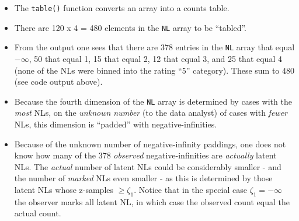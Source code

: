 \documentclass[
]{book}
\newenvironment{Shaded}{\begin{snugshade}}{\end{snugshade}}
\newcommand{\CommentTok}[1]{\textcolor[rgb]{0.56,0.35,0.01}{\textit{#1}}}
\newcommand{\DecValTok}[1]{\textcolor[rgb]{0.00,0.00,0.81}{#1}}
\newcommand{\FunctionTok}[1]{\textcolor[rgb]{0.00,0.00,0.00}{#1}}
\newcommand{\NormalTok}[1]{#1}
\newcommand{\SpecialCharTok}[1]{\textcolor[rgb]{0.00,0.00,0.00}{#1}}
\providecommand{\tightlist}{%
  \setlength{\itemsep}{0pt}\setlength{\parskip}{0pt}}
\begin{document}
\begin{itemize}
\tightlist
\item
  The \texttt{table()} function converts an array into a counts table.
\item
  There are 120 x 4 = 480 elements in the \texttt{NL} array to be ``tabled''.
\item
  From the output one sees that there are 378 entries in the \texttt{NL} array that equal \(-\infty\), 50 that equal 1, 15 that equal 2, 12 that equal 3, and 25 that equal 4 (none of the NLs were binned into the rating ``5'' category). These sum to 480 (see code output above).
\item
  Because the fourth dimension of the \texttt{NL} array is determined by cases with the \emph{most} NLs, on the \emph{unknown number} (to the data analyst) of cases with \emph{fewer} NLs, this dimension is ``padded'' with negative-infinities.\\
\item
  Because of the unknown number of negative-infinity paddings, one does not know how many of the 378 \emph{observed} negative-infinities are \emph{actually} latent NLs. The \emph{actual} number of latent NLs could be considerably smaller - and the number of \emph{marked} NLs even smaller - as this is determined by those latent NLs whose z-samples \(\geq \zeta_1\). Notice that in the special case \(\zeta_1 = -\infty\) the observer marks all latent NL, in which case the observed count equal the actual count.
\end{itemize}

\begin{Shaded}
\end{Shaded}
\end{document}
